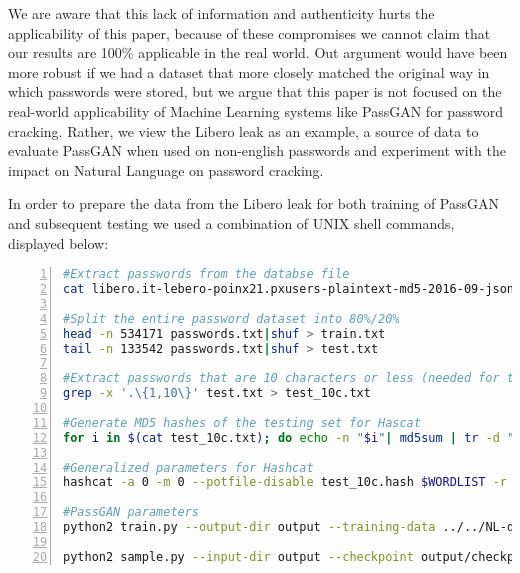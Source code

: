 We are aware that this lack of information and authenticity hurts the applicability of this paper, because of these compromises we cannot claim that our results are 100\% applicable in the real world. Out argument would have been more robust if we had a dataset that more closely matched the original way in which passwords were stored, but we argue that this paper is not focused on the real-world applicability of Machine Learning systems like PassGAN for password cracking. 
Rather, we view the Libero leak as an example, a source of data to evaluate PassGAN when used on non-english passwords and experiment with the impact on Natural Language on password cracking.

\newpage
In order to prepare the data from the Libero leak for both training of PassGAN and subsequent testing we used a combination of UNIX shell commands, displayed below:

\begin{lstlisting}[language=bash,numbers=left,stepnumber=1,breaklines=true,postbreak=\mbox{\textcolor{red}{$\hookrightarrow$}\space}]
#Extract passwords from the databse file
cat libero.it-lebero-poinx21.pxusers-plaintext-md5-2016-09-json-900k-users-extremely-private.txt|grep clearPassword |cut -d ":" -f 2 | awk '{gsub ("\"","");gsub(",","");print $1}' > passwords.txt

#Split the entire password dataset into 80%/20%
head -n 534171 passwords.txt|shuf > train.txt
tail -n 133542 passwords.txt|shuf > test.txt

#Extract passwords that are 10 characters or less (needed for testing)
grep -x '.\{1,10\}' test.txt > test_10c.txt

#Generate MD5 hashes of the testing set for Hascat
for i in $(cat test_10c.txt); do echo -n "$i"| md5sum | tr -d " -" >> test_10c.hash; done

#Generalized parameters for Hashcat
hashcat -a 0 -m 0 --potfile-disable test_10c.hash $WORDLIST -r $RULESET -o out.txt

#PassGAN parameters
python2 train.py --output-dir output --training-data ../../NL-dict/ItWac/libero+ItWac-50.txt

python2 sample.py --input-dir output --checkpoint output/checkpoints/checkpoint_95000.ckpt --output ~/Desktop/Hashcat_tests/passgan_itwac_50.txt -n 14344392 
\end{lstlisting}

